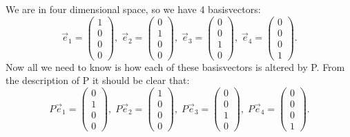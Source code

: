 \documentclass[a4paper]{report}
\begin{document}
\begin{Answer}[ref=eigen3]
\vspace{0.5ex}
\ExePart
\Question We are in four dimensional space, so we have 4 basisvectors:
\begin{equation*}
\vec{e}_1 =  \begin{pmatrix} 1 \\ 0 \\ 0 \\ 0 \end{pmatrix} , \; \vec{e}_2 =  \begin{pmatrix} 0 \\ 1 \\ 0 \\ 0 \end{pmatrix}, \; \vec{e}_3 =  \begin{pmatrix} 0 \\ 0 \\ 1 \\ 0 \end{pmatrix} , \; \vec{e}_4 =  \begin{pmatrix} 0 \\ 0 \\ 0 \\ 1 \end{pmatrix}.
\end{equation*}
Now all we need to know is how each of these basisvectors is altered by P. From the description of P it should be clear that:
\begin{equation*}
P\vec{e}_1 =  \begin{pmatrix} 0 \\ 1 \\ 0 \\ 0 \end{pmatrix} , \; P\vec{e}_2 =  \begin{pmatrix} 1 \\ 0 \\ 0 \\ 0 \end{pmatrix}, \; P\vec{e}_3 =  \begin{pmatrix} 0 \\ 0 \\ 1 \\ 0 \end{pmatrix} , \; P\vec{e}_4 =  \begin{pmatrix} 0 \\ 0 \\ 0 \\ 1 \end{pmatrix}.

\end{equation*}
\end{Answer}
\end{document}
